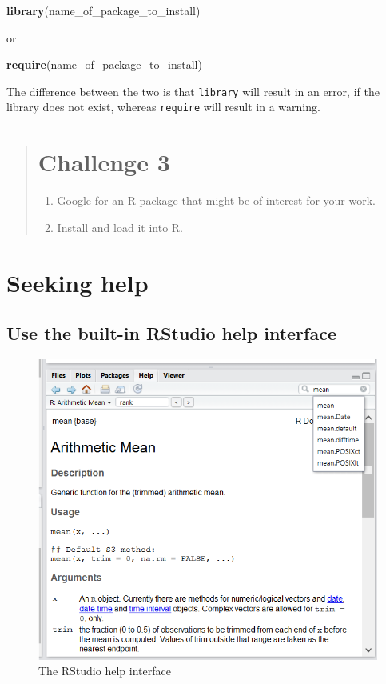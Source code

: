 \documentclass[]{book}
\newenvironment{Shaded}{\begin{snugshade}}{\end{snugshade}}
\newcommand{\KeywordTok}[1]{\textcolor[rgb]{0.13,0.29,0.53}{\textbf{{#1}}}}
\newcommand{\NormalTok}[1]{{#1}}
\providecommand{\tightlist}{%
  \setlength{\itemsep}{0pt}\setlength{\parskip}{0pt}}
\theoremstyle{definition}
\theoremstyle{definition}
\theoremstyle{remark}
\begin{document}
\begin{Shaded}
\begin{Highlighting}[]
\KeywordTok{library}\NormalTok{(name_of_package_to_install)}
\end{Highlighting}
\end{Shaded}

or

\begin{Shaded}
\begin{Highlighting}[]
\KeywordTok{require}\NormalTok{(name_of_package_to_install)}
\end{Highlighting}
\end{Shaded}

The difference between the two is that \texttt{library} will result in
an error, if the library does not exist, whereas \texttt{require} will
result in a warning.

\begin{quote}
\section{Challenge 3}\label{challenge-3}

\begin{enumerate}
\def\labelenumi{\arabic{enumi}.}
\tightlist
\item
  Google for an R package that might be of interest for your work.
\item
  Install and load it into R.
\end{enumerate}
\end{quote}

\section{Seeking help}\label{seeking-help}

\subsection{Use the built-in RStudio help
interface}\label{use-the-built-in-rstudio-help-interface}

\begin{figure}
\includegraphics[width=0.8\linewidth]{img/rstudiohelp} \caption{The RStudio help interface}\label{fig:use-help}
\end{figure}
\end{document}
